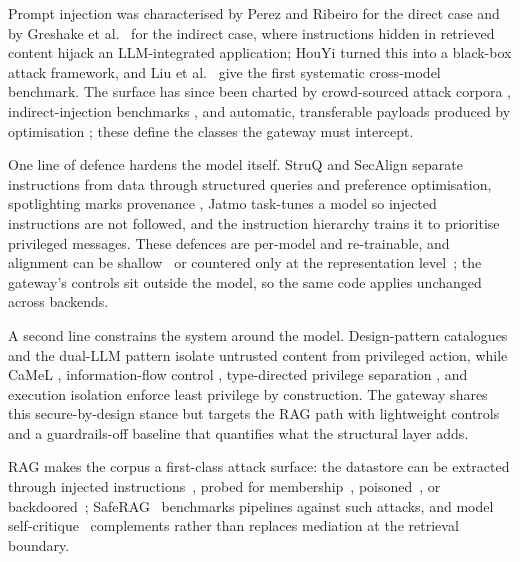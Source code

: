 \documentclass[conference]{IEEEtran}
\begin{document}
Prompt injection was characterised by Perez and Ribeiro \cite{perez2022ignore} for
the direct case and by Greshake et al.\ \cite{greshake2023indirect} for the indirect
case, where instructions hidden in retrieved content hijack an LLM-integrated
application; HouYi \cite{liu2024houyi} turned this into a black-box attack
framework, and Liu et al.\ \cite{liu2024promptinjection} give the first systematic
cross-model benchmark. The surface has since been charted by
crowd-sourced attack corpora \cite{toyer2024tensortrust}, indirect-injection
benchmarks \cite{yi2025bipia}, and automatic, transferable payloads produced by
optimisation \cite{liu2024universalinjection}; these define the classes the gateway
must intercept.

One line of defence hardens the model itself. StruQ \cite{chen2024struq} and SecAlign
\cite{chen2024secalign} separate instructions from data through structured queries
and preference optimisation, spotlighting marks provenance \cite{hines2024spotlighting},
Jatmo \cite{piet2024jatmo} task-tunes a model so injected instructions are not
followed, and the instruction hierarchy \cite{wallace2024instructionhierarchy} trains
it to prioritise privileged messages. These defences are per-model and re-trainable, and alignment can be shallow~\cite{qi2024shallowsafety} or countered only at the representation level~\cite{zou2024circuitbreakers}; the gateway's controls sit outside the model, so the same code applies unchanged across backends.

A second line constrains the system around the model. Design-pattern catalogues
\cite{beurerkellner2025designpatterns} and the dual-LLM pattern
\cite{willison2023dualllm} isolate untrusted content from privileged action, while
CaMeL \cite{debenedetti2025camel}, information-flow control \cite{wu2024fsecure},
type-directed privilege separation \cite{jacob2025typedirected}, and execution
isolation \cite{wu2025isolategpt} enforce least privilege by construction. The
gateway shares this secure-by-design stance but targets the RAG path with
lightweight controls and a guardrails-off baseline that quantifies what the
structural layer adds.

RAG makes the corpus a first-class attack surface: the datastore can be extracted
through injected instructions~\cite{qi2025spillbeans}, probed for
membership~\cite{anderson2025ismydata,zeng2024goodbad}, poisoned~\cite{zou2024poisonedrag},
or backdoored~\cite{chaudhari2024phantom}; SafeRAG~\cite{liang2025saferag} benchmarks
pipelines against such attacks, and model self-critique~\cite{asai2024selfrag}
complements rather than replaces mediation at the retrieval boundary.
\end{document}
